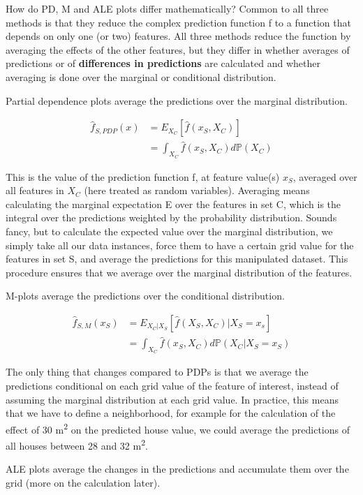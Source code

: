\documentclass[
  11pt,
]{scrbook}
\begin{document}
How do PD, M and ALE plots differ mathematically?
Common to all three methods is that they reduce the complex prediction function f to a function that depends on only one (or two) features.
All three methods reduce the function by averaging the effects of the other features, but they differ in whether averages of predictions or of \textbf{differences in predictions} are calculated and whether averaging is done over the marginal or conditional distribution.

Partial dependence plots average the predictions over the marginal distribution.

\begin{align*}
\hat{f}_{S,PDP}(x)&=E_{X_C}\left[\hat{f}(x_S,X_C)\right] \\
& = \int_{X_C}\hat{f}(x_S,X_C)d\mathbb{P}(X_C)
\end{align*}

This is the value of the prediction function f, at feature value(s) \(x_S\), averaged over all features in \(X_C\) (here treated as random variables).
Averaging means calculating the marginal expectation E over the features in set C, which is the integral over the predictions weighted by the probability distribution.
Sounds fancy, but to calculate the expected value over the marginal distribution, we simply take all our data instances, force them to have a certain grid value for the features in set S, and average the predictions for this manipulated dataset.
This procedure ensures that we average over the marginal distribution of the features.

M-plots average the predictions over the conditional distribution.

\begin{align*}\hat{f}_{S,M}(x_S)&=E_{X_C|X_S}\left[\hat{f}(X_S,X_C)|X_S=x_s\right]\\&=\int_{X_C}\hat{f}(x_S, X_C)d\mathbb{P}(X_C|X_S = x_S)\end{align*}

The only thing that changes compared to PDPs is that we average the predictions conditional on each grid value of the feature of interest, instead of assuming the marginal distribution at each grid value.
In practice, this means that we have to define a neighborhood, for example for the calculation of the effect of 30 m\textsuperscript{2} on the predicted house value, we could average the predictions of all houses between 28 and 32 m\textsuperscript{2}.

ALE plots average the changes in the predictions and accumulate them over the grid (more on the calculation later).
\end{document}
